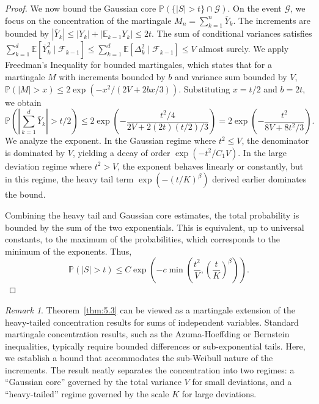 \documentclass[11pt]{amsart}
\theoremstyle{definition}
\theoremstyle{remark}
\newtheorem*{remark}{Remark}
\begin{document}
\begin{proof}
We now bound the Gaussian core $\mathbb{P}(\{|S| > t\} \cap \mathcal{G})$. On the event $\mathcal{G}$, we focus on the concentration of the martingale $M_n = \sum_{k=1}^n \bar{Y}_k$. The increments are bounded by $|\bar{Y}_k| \le |Y_k| + |\mathbb{E}_{k-1}Y_k| \le 2t$. The sum of conditional variances satisfies $\sum_{k=1}^d \mathbb{E}[\bar{Y}_k^2 \mid \mathcal{F}_{k-1}] \le \sum_{k=1}^d \mathbb{E}[\Delta_k^2 \mid \mathcal{F}_{k-1}] \le V$ almost surely. We apply Freedman's Inequality for bounded martingales, which states that for a martingale $M$ with increments bounded by $b$ and variance sum bounded by $V$, $\mathbb{P}(|M| > x) \le 2 \exp( - x^2 / (2V + 2bx/3) )$. Substituting $x = t/2$ and $b = 2t$, we obtain
\begin{equation}
\mathbb{P}\left( \left| \sum_{k=1}^d \bar{Y}_k \right| > t/2 \right) \le 2 \exp\left( - \frac{t^2/4}{2V + 2(2t)(t/2)/3} \right) = 2 \exp\left( - \frac{t^2}{8V + 8t^2/3} \right).
\end{equation}
We analyze the exponent. In the Gaussian regime where $t^2 \le V$, the denominator is dominated by $V$, yielding a decay of order $\exp(-t^2/C_1 V)$. In the large deviation regime where $t^2 > V$, the exponent behaves linearly or constantly, but in this regime, the heavy tail term $\exp(-(t/K)^\beta)$ derived earlier dominates the bound.

Combining the heavy tail and Gaussian core estimates, the total probability is bounded by the sum of the two exponentials. This is equivalent, up to universal constants, to the maximum of the probabilities, which corresponds to the minimum of the exponents. Thus,
\begin{equation}
\mathbb{P}(|S| > t) \le C \exp\left( - c \min\left( \frac{t^2}{V}, \left(\frac{t}{K}\right)^\beta \right) \right).
\end{equation}
\end{proof}

\begin{remark}
Theorem~\ref{thm:5.3} can be viewed as a martingale extension of the heavy-tailed concentration results for sums of independent variables. Standard martingale concentration results, such as the Azuma-Hoeffding or Bernstein inequalities, typically require bounded differences or sub-exponential tails. Here, we establish a bound that accommodates the sub-Weibull nature of the increments. The result neatly separates the concentration into two regimes: a ``Gaussian core'' governed by the total variance $V$ for small deviations, and a ``heavy-tailed'' regime governed by the scale $K$ for large deviations.
\end{remark}
\end{document}

